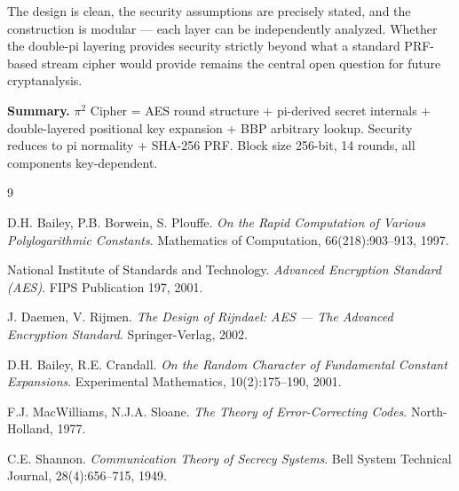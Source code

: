 \documentclass[12pt, a4paper]{article}
\begin{document}
The design is clean, the security assumptions are precisely stated, and the construction is modular — each layer can be independently analyzed. Whether the double-pi layering provides security strictly beyond what a standard PRF-based stream cipher would provide remains the central open question for future cryptanalysis.

\vspace{1.5em}
\begin{highlight}
\textbf{Summary.} $\pi^2$ Cipher = AES round structure + pi-derived secret internals + double-layered positional key expansion + BBP arbitrary lookup. Security reduces to pi normality + SHA-256 PRF. Block size 256-bit, 14 rounds, all components key-dependent.
\end{highlight}

\newpage
\begin{thebibliography}{9}

D.H. Bailey, P.B. Borwein, S. Plouffe.
\textit{On the Rapid Computation of Various Polylogarithmic Constants}.
Mathematics of Computation, 66(218):903--913, 1997.

National Institute of Standards and Technology.
\textit{Advanced Encryption Standard (AES)}.
FIPS Publication 197, 2001.

J. Daemen, V. Rijmen.
\textit{The Design of Rijndael: AES — The Advanced Encryption Standard}.
Springer-Verlag, 2002.

D.H. Bailey, R.E. Crandall.
\textit{On the Random Character of Fundamental Constant Expansions}.
Experimental Mathematics, 10(2):175--190, 2001.

F.J. MacWilliams, N.J.A. Sloane.
\textit{The Theory of Error-Correcting Codes}.
North-Holland, 1977.

C.E. Shannon.
\textit{Communication Theory of Secrecy Systems}.
Bell System Technical Journal, 28(4):656--715, 1949.

\end{thebibliography}
\end{document}
